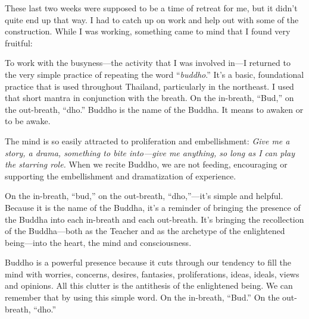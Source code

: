 
These last two weeks were supposed to be a time of retreat for me, but 
it didn't quite end up that way. I had to catch up on work and help out 
with some of the construction. While I was working, something came to 
mind that I found very fruitful:

To work with the busyness---the activity that I was involved in---I 
returned to the very simple practice of repeating the word 
``\emph{buddho}.'' It's a basic, foundational practice that is used 
throughout Thailand, particularly in the northeast. I used that short 
mantra in conjunction with the breath. On the in-breath, ``Bud,'' on 
the out-breath, ``dho.'' Buddho is the name of the Buddha. It means to 
awaken or to be awake.

The mind is so easily attracted to proliferation and embellishment: 
\emph{Give me a story, a drama, something to bite into---give me 
anything, so long as I can play the starring role.} When we recite 
Buddho, we are not feeding, encouraging or supporting the embellishment 
and dramatization of experience.

On the in-breath, ``bud,'' on the out-breath, ``dho,''---it's simple 
and helpful. Because it is the name of the Buddha, it's a reminder of 
bringing the presence of the Buddha into each in-breath and each 
out-breath. It's bringing the recollection of the Buddha---both as the 
Teacher and as the archetype of the enlightened being---into the heart, 
the mind and consciousness.

Buddho is a powerful presence because it cuts through our tendency to 
fill the mind with worries, concerns, desires, fantasies, 
proliferations, ideas, ideals, views and opinions. All this clutter is 
the antithesis of the enlightened being. We can remember that by using 
this simple word. On the in-breath, ``Bud.'' On the out-breath, ``dho.''

